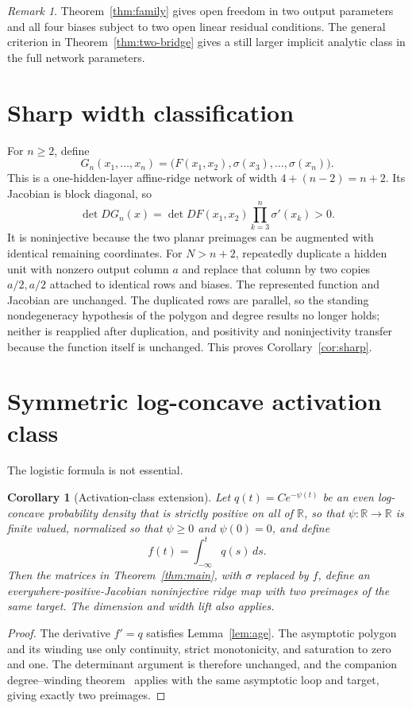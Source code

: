 \documentclass[11pt]{article}
\newtheorem{corollary}[theorem]{Corollary}
\theoremstyle{remark}
\newtheorem{remark}[theorem]{Remark}
\newcommand{\R}{\mathbb R}
\begin{document}
\begin{remark}
Theorem~\ref{thm:family} gives open freedom in two output parameters and all four biases subject to two open linear residual conditions. The general criterion in Theorem~\ref{thm:two-bridge} gives a still larger implicit analytic class in the full network parameters.
\end{remark}

\section{Sharp width classification}\label{sec:lift}
For $n\ge2$, define
\[
 G_n(x_1,\ldots,x_n)
 =\bigl(F(x_1,x_2),\sigma(x_3),\ldots,\sigma(x_n)\bigr).
\]
This is a one-hidden-layer affine-ridge network of width $4+(n-2)=n+2$. Its Jacobian is block diagonal, so
\[
 \det DG_n(x)=\det DF(x_1,x_2)\prod_{k=3}^n\sigma'(x_k)>0.
\]
It is noninjective because the two planar preimages can be augmented with identical remaining coordinates. For $N>n+2$, repeatedly duplicate a hidden unit with nonzero output column $a$ and replace that column by two copies $a/2,a/2$ attached to identical rows and biases. The represented function and Jacobian are unchanged. The duplicated rows are parallel, so the standing nondegeneracy hypothesis of the polygon and degree results no longer holds; neither is reapplied after duplication, and positivity and noninjectivity transfer because the function itself is unchanged. This proves Corollary~\ref{cor:sharp}.

\section{Symmetric log-concave activation class}\label{sec:activation}
The logistic formula is not essential.

\begin{corollary}[Activation-class extension]\label{cor:activation}
Let $q(t)=C e^{-\psi(t)}$ be an even log-concave probability density that is strictly positive on all of $\R$, so that $\psi:\R\to\R$ is finite valued, normalized so that $\psi\ge0$ and $\psi(0)=0$, and define
\[
 f(t)=\int_{-\infty}^{t}q(s)\,ds.
\]
Then the matrices in Theorem~\ref{thm:main}, with $\sigma$ replaced by $f$, define an everywhere-positive-Jacobian noninjective ridge map with two preimages of the same target. The dimension and width lift also applies.
\end{corollary}

\begin{proof}
The derivative $f'=q$ satisfies Lemma~\ref{lem:age}. The asymptotic polygon and its winding use only continuity, strict monotonicity, and saturation to zero and one. The determinant argument is therefore unchanged, and the companion degree--winding theorem~\cite{DixonPolygon} applies with the same asymptotic loop and target, giving exactly two preimages.
\end{proof}
\end{document}
